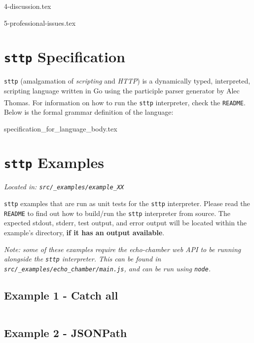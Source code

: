 \documentclass[]{full}
\theoremstyle{definition}
\begin{document}
{4-discussion.tex}

{5-professional-issues.tex}


\appendix

\cprotect\chapter{\verb|sttp| Specification}
\label{appendix:sttp-specification}

\verb|sttp| (amalgamation of \textit{scripting} and \textit{HTTP}) is a dynamically typed, interpreted, scripting language written in Go using the participle parser generator by Alec Thomas\textsuperscript{\cite{thomas_2021}}. For information on how to run the \verb|sttp| interpreter, check the \verb|README|. Below is the formal grammar definition of the language:

{specification_for_language_body.tex}

\cprotect\chapter{\verb|sttp| Examples}
\label{appendix:sttp-examples}

\cprotect\textit{Located in: \verb|src/_examples/example_XX|}

\verb|sttp| examples that are run as unit tests for the \verb|sttp| interpreter. Please read the \verb|README| to find out how to build/run the \verb|sttp| interpreter from source. The expected stdout, stderr, test output, and error output will be located within the example's directory, \textbf{if it has an output available}.

\cprotect\textit{Note: some of these examples require the echo-chamber web API to be running alongside the \verb|sttp| interpreter. This can be found in \verb|src/_examples/echo_chamber/main.js|, and can be run using \verb|node|.}

\section{Example 1 - Catch all}
\label{appendix:sttp-examples-1}
\inputminted[autogobble, breaklines, tabsize=4]{text}{../../src/_examples/example_01/example_01.sttp}

\section{Example 2 - JSONPath}
\label{appendix:sttp-examples-2}
\inputminted[autogobble, breaklines, tabsize=4]{text}{../../src/_examples/example_02/example_02.sttp}
\end{document}
